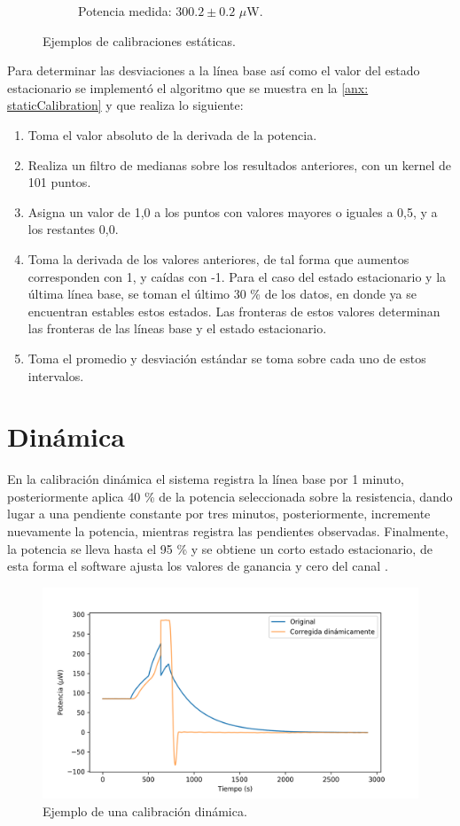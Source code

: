 \begin{figure}[h]
\begin{subfigure}{0.45\linewidth}
			\caption{Potencia medida: $300.2 \pm 0.2$ $\mu$W.}
			\label{fig: noZeroCal}
		\end{subfigure}
		\caption{Ejemplos de calibraciones estáticas.}
		\label{fig: staticCalibrations}
	\end{figure}

	\newpage
	Para determinar las desviaciones a la línea base así como el valor del estado estacionario se implementó el algoritmo que se muestra en la \autoref{anx: staticCalibration} y que realiza lo siguiente:
	\begin{enumerate}
		\item Toma el valor absoluto de la derivada de la potencia.
		\item Realiza un filtro de medianas sobre los resultados anteriores, con un kernel de 101 puntos.
		\item Asigna un valor de 1,0 a los puntos con valores mayores o iguales a 0,5, y a los restantes 0,0.
		\item Toma la derivada de los valores anteriores, de tal forma que aumentos corresponden con 1, y caídas con -1. Para el caso del estado estacionario y la última línea base, se toman el último 30 \% de los datos, en donde ya se encuentran estables estos estados. Las fronteras de estos valores determinan las fronteras de las líneas base y el estado estacionario.
		\item Toma el promedio y desviación estándar se toma sobre cada uno de estos intervalos.
	\end{enumerate}
	
	\newpage
	\section{Din\'amica}
	En la calibración dinámica el sistema registra la línea base por 1 minuto, posteriormente aplica 40 \% de la potencia seleccionada sobre la resistencia, dando lugar a una pendiente constante por tres minutos, posteriormente, incremente nuevamente la potencia, mientras registra las pendientes observadas. Finalmente, la potencia se lleva hasta el 95 \% y se obtiene un corto estado estacionario, de esta forma el software ajusta los valores de ganancia y cero del canal \cite{Suurkuusk}. 
	\begin{figure}[h]
		\centering
		\includegraphics[width=\linewidth]{../Data/ElectricalCalibrations/Dynamic/dynamic}
		\caption{Ejemplo de una calibración dinámica.}
		\label{fig: dynamicCalibration}
	\end{figure}

